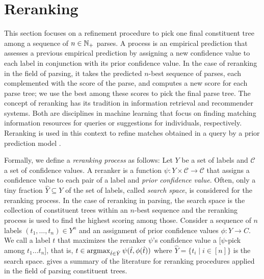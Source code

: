 \documentclass[../../document.tex]{subfiles}
\begin{document}
    \section{Reranking}\label{sec:reranking}
    This section focuses on a refinement procedure to pick one final constituent tree among a sequence of \(n \in \mathbb{N}_+\) parses.
    A  process is an empirical prediction that assesses a previous empirical prediction by assigning a new confidence value to each label in conjunction with its prior confidence value.
    In the case of reranking in the field of parsing, it takes the predicted \(n\)-best sequence of parses, each complemented with the score of the parse, and computes a new score for each parse tree; we use the best among these scores to pick the final parse tree.
    The concept of reranking has its tradition in information retrieval and recommender systems. Both are disciplines in machine learning that focus on finding matching information resources for queries or suggestions for individuals, respectively.
    Reranking is used in this context to refine matches obtained in a query by a prior prediction model \citep{carbonell1998use,adomavicius2009toward}.

    Formally, we define a \emph{reranking process} as follows:
        Let \(Y\) be a set of labels and \(\mathcal{C}\) a set of confidence values.
        A reranker is a function \(\psi \colon Y \times \mathcal{C} \to \mathcal{C}\) that assigns a confidence value to each pair of a label and \emph{prior confidence value}.
    Often, only a tiny fraction \(\hat{Y} \subseteq Y\) of the set of labels, called \emph{search space}, is considered for the reranking process.
    In the case of reranking in parsing, the search space is the collection of constituent trees within an \(n\)-best sequence and the reranking process is used to find the highest scoring among those.
    Consider a sequence of \(n\) labels \((t_1, \ldots, t_n) \in Y^n\) and an assignment of prior confidence values \(\phi \colon Y \to C\).
    We call a label \(t\) that maximizes the reranker \(\psi\)'s confidence value a [\(\psi\)-pick among \(t_1 \ldots t_n\)], that is, \(
        t \in \operatorname{arg max}_{\hat{t} \in \hat{Y}} \psi(\hat{t}, \phi(\hat{t}))
    \) where \(\hat{Y} = \{t_i \mid i \in [n]\}\) is the search space.
     gives a summary of the literature for reranking procedures applied in the field of parsing constituent trees.
\end{document}
